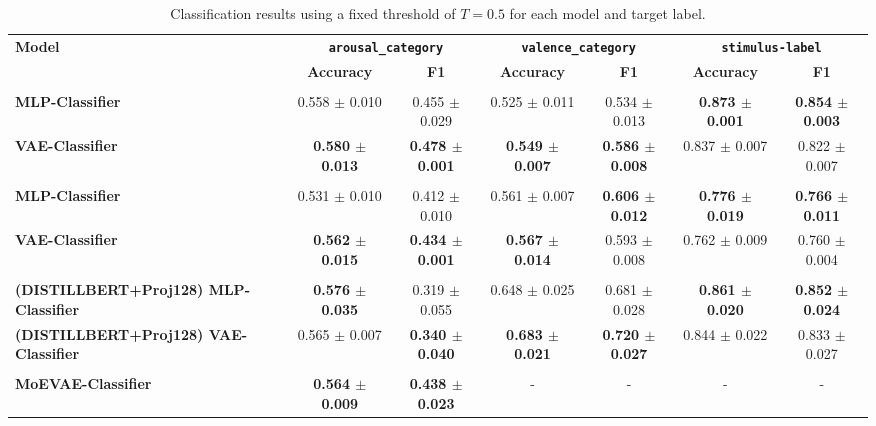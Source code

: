\begin{table}[H]
\centering
\scriptsize
\setlength{\tabcolsep}{4pt}
\caption{Classification results using a fixed threshold of $T=0.5$ for each model and target label.}
\label{tab:results_grouped_fixed_threshold}
\begin{tabular}{lcccccc}
\hline
\textbf{Model} & \multicolumn{2}{c}{\textbf{\texttt{arousal\_category}}} & \multicolumn{2}{c}{\textbf{\texttt{valence\_category}}} & \multicolumn{2}{c}{\textbf{\texttt{stimulus-label}}} \\
\cline{2-3}\cline{4-5}\cline{6-7}
 & \textbf{Accuracy} & \textbf{F1} & \textbf{Accuracy} & \textbf{F1} & \textbf{Accuracy} & \textbf{F1} \\
\hline
\rowcolor{EDABlue}\multicolumn{7}{l}{\textbf{EDA}} \\
\textbf{MLP-Classifier} & 0.558 $\pm$ 0.010 & 0.455 $\pm$ 0.029 & 0.525 $\pm$ 0.011 & 0.534 $\pm$ 0.013 & \textbf{0.873 $\pm$ 0.001} & \textbf{0.854 $\pm$ 0.003} \\
\textbf{VAE-Classifier} & \textbf{0.580 $\pm$ 0.013} & \textbf{0.478 $\pm$ 0.001} & \textbf{0.549 $\pm$ 0.007} & \textbf{0.586 $\pm$ 0.008} & 0.837 $\pm$ 0.007 & 0.822 $\pm$ 0.007 \\
\hline
\rowcolor{PPGGreen}\multicolumn{7}{l}{\textbf{PPG}} \\
\textbf{MLP-Classifier} & 0.531 $\pm$ 0.010 & 0.412 $\pm$ 0.010 & 0.561 $\pm$ 0.007 & \textbf{0.606 $\pm$ 0.012} & \textbf{0.776 $\pm$ 0.019} & \textbf{0.766 $\pm$ 0.011} \\
\textbf{VAE-Classifier} & \textbf{0.562 $\pm$ 0.015} & \textbf{0.434 $\pm$ 0.001} & \textbf{0.567 $\pm$ 0.014} & 0.593 $\pm$ 0.008 & 0.762 $\pm$ 0.009 & 0.760 $\pm$ 0.004 \\
\hline
\rowcolor{TEXTOrange}\multicolumn{7}{l}{\textbf{TEXT}} \\
\textbf{(DISTILLBERT+Proj128) MLP-Classifier} & \textbf{0.576 $\pm$ 0.035} & 0.319 $\pm$ 0.055 & 0.648 $\pm$ 0.025 & 0.681 $\pm$ 0.028 & \textbf{0.861 $\pm$ 0.020} & \textbf{0.852 $\pm$ 0.024} \\
\textbf{(DISTILLBERT+Proj128) VAE-Classifier} & 0.565 $\pm$ 0.007 & \textbf{0.340 $\pm$ 0.040} & \textbf{0.683 $\pm$ 0.021} & \textbf{0.720 $\pm$ 0.027} & 0.844 $\pm$ 0.022 & 0.833 $\pm$ 0.027 \\
\hline
\rowcolor{gray!20}\multicolumn{7}{l}{\textbf{EDA+PPG}} \\
\textbf{MoEVAE-Classifier} & \textbf{0.564 $\pm$ 0.009} & \textbf{0.438 $\pm$ 0.023} & - & - & - & - \\
\hline
\end{tabular}
\end{table}
